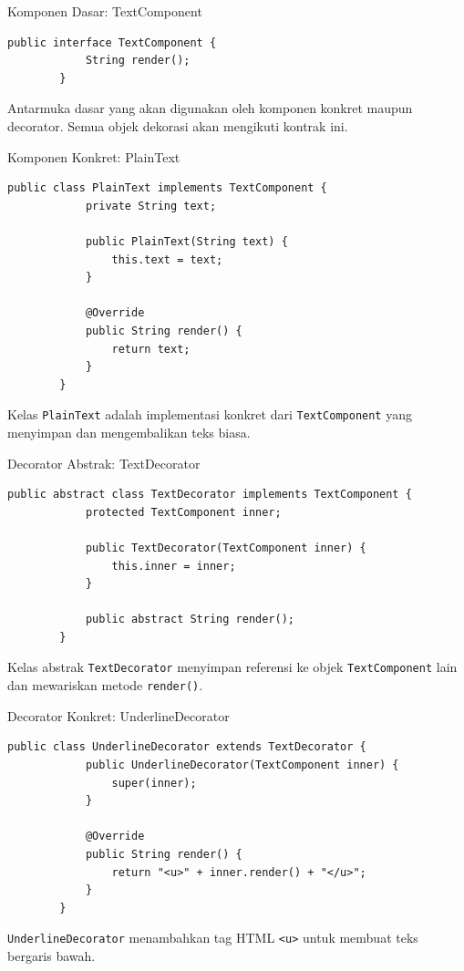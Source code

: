 \documentclass[aspectratio=169, table]{beamer}
\begin{document}
\begin{frame}[fragile]{Komponen Dasar: TextComponent}
	\vspace{20pt}
	\begin{lstlisting}[style=JavaStyle]
		public interface TextComponent {
			String render();
		}
	\end{lstlisting}
	\small
	Antarmuka dasar yang akan digunakan oleh komponen konkret maupun decorator. Semua objek dekorasi akan mengikuti kontrak ini.
\end{frame}

\begin{frame}[fragile]{Komponen Konkret: PlainText}
	\vspace{20pt}
	\begin{lstlisting}[style=JavaStyle]
		public class PlainText implements TextComponent {
			private String text;
			
			public PlainText(String text) {
				this.text = text;
			}
			
			@Override
			public String render() {
				return text;
			}
		}
	\end{lstlisting}
	\small
	Kelas \texttt{PlainText} adalah implementasi konkret dari \texttt{TextComponent} yang menyimpan dan mengembalikan teks biasa.
\end{frame}

\begin{frame}[fragile]{Decorator Abstrak: TextDecorator}
	\vspace{20pt}
	\begin{lstlisting}[style=JavaStyle]
		public abstract class TextDecorator implements TextComponent {
			protected TextComponent inner;
			
			public TextDecorator(TextComponent inner) {
				this.inner = inner;
			}
			
			public abstract String render();
		}
	\end{lstlisting}
	\small
	Kelas abstrak \texttt{TextDecorator} menyimpan referensi ke objek \texttt{TextComponent} lain dan mewariskan metode \texttt{render()}.
\end{frame}

\begin{frame}[fragile]{Decorator Konkret: UnderlineDecorator}
	\vspace{20pt}
	\begin{lstlisting}[style=JavaStyle]
		public class UnderlineDecorator extends TextDecorator {
			public UnderlineDecorator(TextComponent inner) {
				super(inner);
			}
			
			@Override
			public String render() {
				return "<u>" + inner.render() + "</u>";
			}
		}
	\end{lstlisting}
	\small
	\texttt{UnderlineDecorator} menambahkan tag HTML \texttt{<u>} untuk membuat teks bergaris bawah.
\end{frame}
\end{document}
